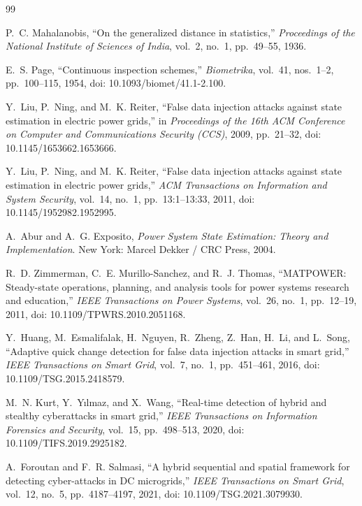 \documentclass[12pt,a4paper]{report}
\begin{document}
\begin{thebibliography}{99}

P.~C. Mahalanobis,
``On the generalized distance in statistics,''
\textit{Proceedings of the National Institute of Sciences of India},
vol.~2, no.~1, pp.~49--55, 1936.

E.~S. Page,
``Continuous inspection schemes,''
\textit{Biometrika}, vol.~41, nos.~1--2, pp.~100--115, 1954,
doi: 10.1093/biomet/41.1-2.100.

Y.~Liu, P.~Ning, and M.~K. Reiter,
``False data injection attacks against state estimation in electric power grids,''
in \textit{Proceedings of the 16th ACM Conference on Computer and Communications Security (CCS)},
2009, pp.~21--32, doi: 10.1145/1653662.1653666.

Y.~Liu, P.~Ning, and M.~K. Reiter,
``False data injection attacks against state estimation in electric power grids,''
\textit{ACM Transactions on Information and System Security},
vol.~14, no.~1, pp.~13:1--13:33, 2011, doi: 10.1145/1952982.1952995.

A.~Abur and A.~G. Exposito,
\textit{Power System State Estimation: Theory and Implementation}.
New York: Marcel Dekker / CRC Press, 2004.

R.~D. Zimmerman, C.~E. Murillo-Sanchez, and R.~J. Thomas,
``MATPOWER: Steady-state operations, planning, and analysis tools for power systems research and education,''
\textit{IEEE Transactions on Power Systems},
vol.~26, no.~1, pp.~12--19, 2011, doi: 10.1109/TPWRS.2010.2051168.

Y.~Huang, M.~Esmalifalak, H.~Nguyen, R.~Zheng, Z.~Han, H.~Li, and L.~Song,
``Adaptive quick change detection for false data injection attacks in smart grid,''
\textit{IEEE Transactions on Smart Grid},
vol.~7, no.~1, pp.~451--461, 2016, doi: 10.1109/TSG.2015.2418579.

M.~N. Kurt, Y.~Y\i lmaz, and X.~Wang,
``Real-time detection of hybrid and stealthy cyberattacks in smart grid,''
\textit{IEEE Transactions on Information Forensics and Security},
vol.~15, pp.~498--513, 2020, doi: 10.1109/TIFS.2019.2925182.

A.~Foroutan and F.~R. Salmasi,
``A hybrid sequential and spatial framework for detecting cyber-attacks in DC microgrids,''
\textit{IEEE Transactions on Smart Grid},
vol.~12, no.~5, pp.~4187--4197, 2021, doi: 10.1109/TSG.2021.3079930.


\end{thebibliography}
\end{document}
